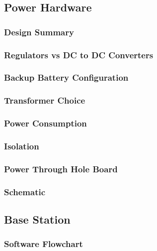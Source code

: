 \subsection{Power Hardware}

\subsubsection{Design Summary}

\subsubsection{Regulators vs DC to DC Converters}

\subsubsection{Backup Battery Configuration}

\subsubsection{Transformer Choice}

\subsubsection{Power Consumption}

\subsubsection{Isolation}

\subsubsection{Power Through Hole Board}

\subsubsection{Schematic}

\subsection{Base Station}

\subsubsection{Software Flowchart}

